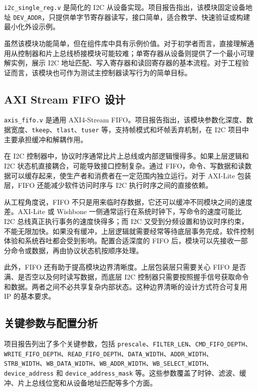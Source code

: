 \documentclass[12pt,a4paper]{article}
\numberwithin{equation}{section}
\begin{document}
\texttt{i2c\_single\_reg.v} 是简化的 I2C 从设备实现。项目报告指出，该模块固定设备地址 \texttt{DEV\_ADDR}，只提供单字节寄存器读写，接口简单，适合教学、快速验证或构建最小化外设示例。

虽然该模块功能简单，但在组件库中具有示例价值。对于初学者而言，直接理解通用从控制器和片上总线桥接模块可能较难；单寄存器从设备则提供了一个最小可理解实例，展示 I2C 地址匹配、写入寄存器和读回寄存器的基本流程。对于工程验证而言，该模块也可作为测试主控制器读写行为的简单目标。

\subsection{AXI Stream FIFO 设计}

\texttt{axis\_fifo.v} 是通用 AXI4-Stream FIFO。项目报告指出，该模块参数化深度、数据宽度、\texttt{tkeep}、\texttt{tlast}、\texttt{tuser} 等，支持帧模式和坏帧丢弃机制，在 I2C 项目中主要承担缓冲和解耦作用。

在 I2C 控制器中，协议时序通常比片上总线或内部逻辑慢得多。如果上层逻辑和 I2C 状态机直接耦合，可能导致接口控制复杂。通过 FIFO，命令、写数据和读数据可以缓存起来，使生产者和消费者在一定范围内独立运行。对于 AXI-Lite 包装层，FIFO 还能减少软件访问时序与 I2C 执行时序之间的直接依赖。

从工程角度说，FIFO 不只是用来临时存数据，它还可以缓冲不同模块之间的速度差。AXI-Lite 或 Wishbone 一侧通常运行在系统时钟下，写命令的速度可能比 I2C 总线真正执行事务的速度快得多；而 I2C 又受到分频设置和协议时序约束，不能无限加快。如果没有缓冲，上层逻辑就需要经常等待底层事务完成，软件控制体验和系统吞吐都会受到影响。配置合适深度的 FIFO 后，模块可以先接收一部分命令或数据，再由协议状态机按顺序处理。

此外，FIFO 还有助于提高模块边界清晰度。上层包装层只需要关心 FIFO 是否满、是否空以及何时读写数据，而底层 I2C 控制器只需要按照握手信号获取命令和数据。两者之间不必共享复杂内部状态。这种边界清晰的设计方式符合可复用 IP 的基本要求。

\subsection{关键参数与配置分析}

项目报告列出了多个关键参数，包括 \texttt{prescale}、\texttt{FILTER\_LEN}、\texttt{CMD\_FIFO\_DEPTH}、\texttt{WRITE\_FIFO\_DEPTH}、\texttt{READ\_FIFO\_DEPTH}、\texttt{DATA\_WIDTH}、\texttt{ADDR\_WIDTH}、\texttt{STRB\_WIDTH}、\texttt{WB\_DATA\_WIDTH}、\texttt{WB\_ADDR\_WIDTH}、\texttt{WB\_SELECT\_WIDTH}、\texttt{device\_address} 和 \texttt{device\_address\_mask} 等。这些参数覆盖了时钟、滤波、缓冲、片上总线位宽和从设备地址匹配等多个方面。
\end{document}
